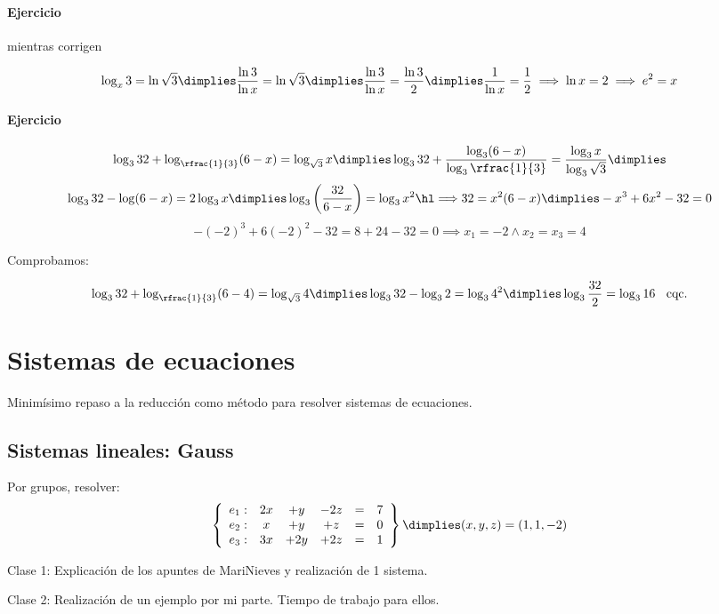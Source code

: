 \paragraph{Ejercicio} mientras corrigen

\[
	\log_x 3 = \ln \sqrt{3} \dimplies \frac{\ln3}{\ln x}=\ln\sqrt{3} \dimplies \frac{\ln3}{\ln x}=\frac{\ln3}{2} \dimplies \frac{1}{\ln x}=\frac{1}{2} \implies \ln x = 2 \implies e^2=x
\]

\paragraph{Ejercicio}
\[
	\log_332+\log_{\rfrac{1}{3}}(6-x) = \log_{\sqrt{3}}x \dimplies \log_332+\frac{\log_3(6-x)}{\log_3\rfrac{1}{3}} = \frac{\log_3x}{\log_3{\sqrt{3}}} \dimplies 
\]
\[
	\log_332-\log(6-x)=2\log_3x\dimplies \log_3\left(\frac{32}{6-x}\right)=\log_3x^2 \cimplies 32=x^2(6-x) \dimplies -x^3+6x^2-32 = 0
\]
\[
	-(-2)^3 + 6(-2)^2-32 = 8+24-32 = 0\implies x_1=-2 \wedge x_2=x_3=4
\]
 
Comprobamos:

\[
	\log_332+\log_{\rfrac{1}{3}}(6-4) = \log_{\sqrt{3}}4 \dimplies \log_332-\log_32=\log_34^2 \dimplies \log_3\frac{32}{2}=\log_316 \;\;\text{   cqc.}
\]



\section{Sistemas de ecuaciones}

Minimísimo repaso a la reducción como método para resolver sistemas de ecuaciones.

\subsection{Sistemas lineales: Gauss}

Por grupos, resolver:
\[
\left\{\begin{array}{lccccc}
e_1: &2x&+y&-2z&=&7\\
e_2: &x&+y&+z&=&0\\
e_3: &3x&+2y&+2z&=&1
\end{array}\right\} \dimplies (x,y,z) = (1,1,-2)
\]



Clase 1: Explicación de los apuntes de MariNieves y realización de 1 sistema.

Clase 2: Realización de un ejemplo por mi parte. Tiempo de trabajo para ellos.

